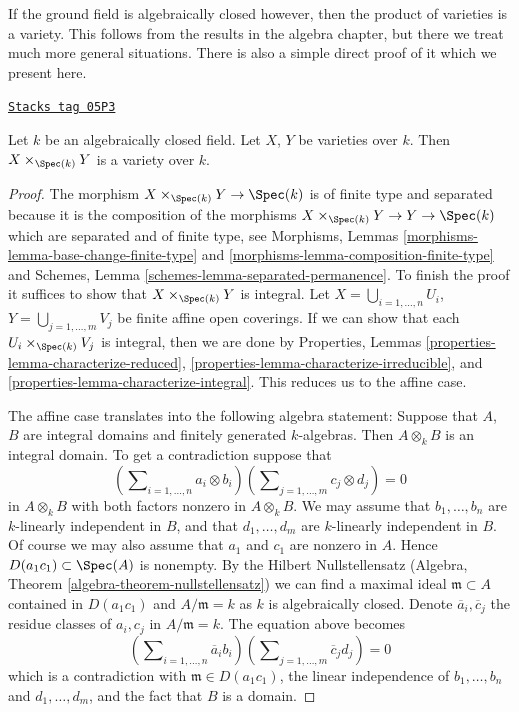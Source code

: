 If the ground field is algebraically closed however, then the
product of varieties is a variety. This follows from the results
in the algebra chapter, but there we treat much more general situations.
There is also a simple direct proof of it which we present here.

\begin{lemma}
\label{varieties-lemma-product-varieties}
\href{https://stacks.math.columbia.edu/tag/05P3}{\texttt{Stacks tag 05P3}}


Let $k$ be an algebraically closed field.
Let $X$, $Y$ be varieties over $k$.
Then $X \times_{\Spec(k)} Y$ is a variety over $k$.
\end{lemma}

\begin{proof}
The morphism $X \times_{\Spec(k)} Y \to \Spec(k)$ is of
finite type and separated because it is the composition of the
morphisms $X \times_{\Spec(k)} Y \to Y \to \Spec(k)$
which are separated and of finite type, see
Morphisms, Lemmas \ref{morphisms-lemma-base-change-finite-type} and
\ref{morphisms-lemma-composition-finite-type}
and
Schemes, Lemma \ref{schemes-lemma-separated-permanence}.
To finish the proof it suffices to show that $X \times_{\Spec(k)} Y$
is integral.
Let $X = \bigcup_{i = 1, \ldots, n} U_i$,
$Y = \bigcup_{j = 1, \ldots, m} V_j$ be finite affine open coverings.
If we can show that each $U_i \times_{\Spec(k)} V_j$ is integral,
then we are done by
Properties, Lemmas \ref{properties-lemma-characterize-reduced},
\ref{properties-lemma-characterize-irreducible}, and
\ref{properties-lemma-characterize-integral}.
This reduces us to the affine case.

\medskip\noindent
The affine case translates into the following algebra statement: Suppose
that $A$, $B$ are integral domains and finitely generated $k$-algebras.
Then $A \otimes_k B$ is an integral domain. To get a contradiction suppose that
$$
(\sum\nolimits_{i = 1, \ldots, n} a_i \otimes b_i)
(\sum\nolimits_{j = 1, \ldots, m} c_j \otimes d_j) = 0
$$
in $A \otimes_k B$ with both factors nonzero in $A \otimes_k B$.
We may assume that $b_1, \ldots, b_n$ are $k$-linearly
independent in $B$, and that $d_1, \ldots, d_m$ are $k$-linearly independent
in $B$. Of course we may also assume that $a_1$ and $c_1$ are nonzero
in $A$. Hence $D(a_1c_1) \subset \Spec(A)$ is nonempty. By the
Hilbert Nullstellensatz
(Algebra, Theorem \ref{algebra-theorem-nullstellensatz})
we can find a maximal ideal $\mathfrak m \subset A$ contained in
$D(a_1c_1)$ and $A/\mathfrak m = k$ as $k$ is algebraically closed.
Denote $\overline{a}_i, \overline{c}_j$ the residue classes of
$a_i, c_j$ in $A/\mathfrak m = k$. The equation above becomes
$$
(\sum\nolimits_{i = 1, \ldots, n} \overline{a}_i b_i)
(\sum\nolimits_{j = 1, \ldots, m} \overline{c}_j d_j) = 0
$$
which is a contradiction with
$\mathfrak m \in D(a_1c_1)$, the linear independence of
$b_1, \ldots, b_n$ and $d_1, \ldots, d_m$, and the fact that $B$ is a domain.
\end{proof}

